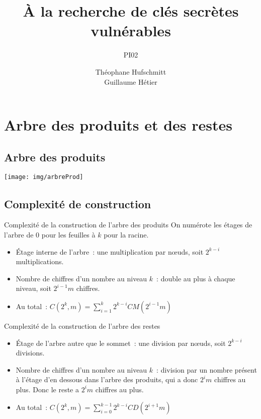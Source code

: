 \documentclass{beamer}
\title{À la recherche de clés secrètes vulnérables}
\subtitle{PI02}
\date{}
\author{Théophane Hufschmitt\\Guillaume Hétier}
\begin{document}
\beamerdefaultoverlayspecification{<+->}

\section{Arbre des produits et des restes}
\subsection{Arbre des produits}
\begin{frame}
  \texttt{[image: img/arbreProd]}  
\end{frame}

\subsection{Complexité de construction}
\begin{frame}
  \begin{block}{Complexité de la construction de l'arbre des produits}
  On numérote les étages de l'arbre de $0$ pour les feuilles à $k$ pour la racine. 
   \begin{itemize}
    \item Étage interne de l'arbre~: une multiplication par nœuds, soit $2^{k-i}$ multiplications.
    \item Nombre de chiffres d'un nombre au niveau $k$~: double au plus à chaque niveau, soit $2^{i-1}m$ chiffres.
    \item Au total~: $C(2^k,m) = \sum_{i=1}^k 2^{k-i}CM(2^{i-1}m)$
   \end{itemize}
  \end{block}
  \begin{block}{Complexité de la construction de l'arbre des restes}
    \begin{itemize}
    \item Étage de l'arbre autre que le sommet~: une division par nœuds, soit $2^{k-i}$ divisions.
    \item Nombre de chiffres d'un nombre au niveau $k$~: division par un nombre présent à l'étage d'en dessous dans l'arbre des produits, qui a donc $2^{i}m$ chiffres au plus. Donc le reste a $2^{i}m$ chiffres au plus.
    \item Au total~: $C(2^k,m) = \sum_{i=0}^{k-1} 2^{k-i}CD(2^{i+1}m)$
   \end{itemize}
  \end{block}
\end{frame}
\end{document}
